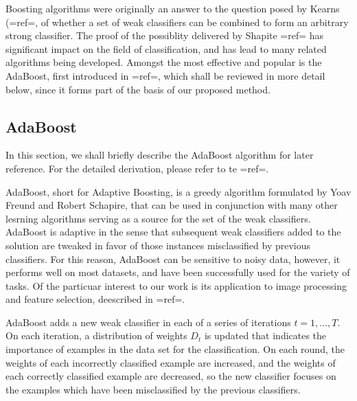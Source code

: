 {Boosting algorithms were originally an answer to the question posed by Kearns ({{=ref=}}, of whether a set of weak classifiers can be combined to form an arbitrary strong classifier. The proof of the possiblity delivered by Shapite {{=ref=}} has significant impact on the field of classification, and has lead to many related algorithms being developed. Amongst the most effective and popular is the AdaBoost, first introduced in {{=ref=}}, which shall be reviewed in more detail below, since it forms part of the basis of our proposed method.

\subsection{AdaBoost} 

In this section, we shall briefly describe the AdaBoost algorithm for later reference. For the detailed derivation, please refer to te {{=ref=}}.

AdaBoost, short for Adaptive Boosting, is a greedy algorithm formulated by Yoav Freund and Robert Schapire, that can be used in conjunction with many other lesrning algorithms serving as a source for the set of the weak classifiers. AdaBoost is adaptive in the sense that subsequent weak classifiers added to the solution are tweaked in favor of those instances misclassified by previous classifiers. For this reason,  AdaBoost can be sensitive to noisy data, however, it performs well on most datasets, and have been successfully used for the variety of tasks.  Of the particuar interest to our work is its application to image processing and feature selection, deescribed in {{=ref=}}. 

AdaBoost adds a new weak classifier in each of a series of iterations  $t = 1,\ldots,T$. On each iteration, a distribution of weights $D_{t}$ is updated that indicates the importance of examples in the data set for the classification. On each round, the weights of each incorrectly classified example are increased, and the weights of each correctly classified example are decreased, so the new classifier focuses on the examples which have been misclassified by the previous classifiers.

}
